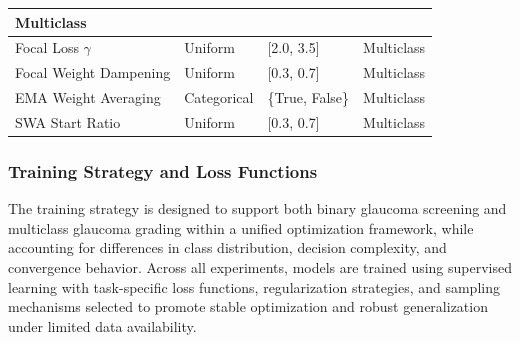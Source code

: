 \documentclass[preprint,12pt]{elsarticle}
\begin{document}
\begin{table}[!t]
\begin{tabular}{|p{}|p{}|p{}|p{}|}
        Multiclass                                                                                                                                                     \\
        \hline
        Focal Loss $\gamma$                                                      &
        Uniform                                                                  &
        [2.0, 3.5]                                                               &
        Multiclass                                                                                                                                                     \\
        \hline
        Focal Weight Dampening                                                   &
        Uniform                                                                  &
        [0.3, 0.7]                                                               &
        Multiclass                                                                                                                                                     \\
        \hline
        EMA Weight Averaging                                                     &
        Categorical                                                              &
        \{True, False\}                                                          &
        Multiclass                                                                                                                                                     \\
        \hline
        SWA Start Ratio                                                          &
        Uniform                                                                  &
        [0.3, 0.7]                                                               &
        Multiclass                                                                                                                                                     \\
        \hline
    \end{tabular}
\end{table}

\subsubsection{Training Strategy and Loss Functions}
\label{subsubsec:training_losses}

The training strategy is designed to support both binary glaucoma screening and multiclass glaucoma grading within a unified optimization framework, while accounting for differences in class distribution, decision complexity, and convergence behavior. Across all experiments, models are trained using supervised learning with task-specific loss functions, regularization strategies, and sampling mechanisms selected to promote stable optimization and robust generalization under limited data availability.
\end{document}
